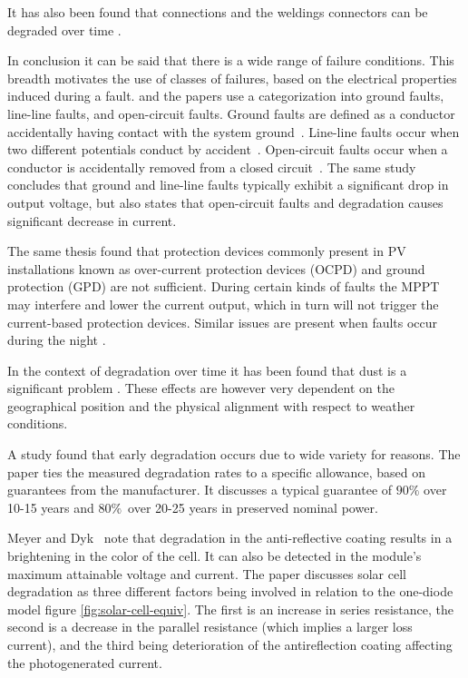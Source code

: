 It has also been found that connections and the weldings connectors can be degraded over time \cite{Houssein2010}.

In conclusion it can be said that there is a wide range of failure conditions.
This breadth motivates the use of classes of failures, based on the electrical properties induced during a fault.
\cite{Zhao2010thesis} and the papers \cite{Zhao2012tree,Zhao2013graph,Zhao2013outlier} use a categorization into ground faults, line-line faults, and open-circuit faults.
Ground faults are defined as a conductor accidentally having contact with the system ground~\cite{Zhao2010thesis}.
Line-line faults occur when two different potentials conduct by accident~\cite{Zhao2010thesis}.
Open-circuit faults occur when a conductor is accidentally removed from a closed circuit~\cite{Zhao2010thesis}.
The same study concludes that ground and line-line faults typically exhibit a significant drop in output voltage,
but also states that open-circuit faults and degradation causes significant decrease in current.

The same thesis found that protection devices commonly present in PV installations known as over-current protection devices (OCPD) and ground protection (GPD) are not sufficient.
During certain kinds of faults the MPPT may interfere and lower the current output, which in turn will not trigger the current-based protection devices.
Similar issues are present when faults occur during the night \cite{Zhao2010night}.

In the context of degradation over time it has been found that dust is a significant problem \cite{Mani2010}.
These effects are however very dependent on the geographical position and the physical alignment with respect to weather conditions.

A study \cite{Munoz2011} found that early degradation occurs due to wide variety for reasons.
The paper ties the measured degradation rates to a specific allowance, based on guarantees from the manufacturer.
It discusses a typical guarantee of $90\%$ over 10-15 years and $80\%$ over 20-25 years in preserved nominal power.

Meyer and Dyk~\cite{Meyer2004} note that degradation in the anti-reflective coating results in a brightening in the color of the cell.
It can also be detected in the module's maximum attainable voltage and current.
The paper discusses solar cell degradation as three different factors being involved in relation to the one-diode model figure \ref{fig:solar-cell-equiv}.
The first is an increase in series resistance, the second is a decrease in the parallel resistance (which implies a larger loss current), and the third being deterioration of the antireflection coating affecting the photogenerated current.

